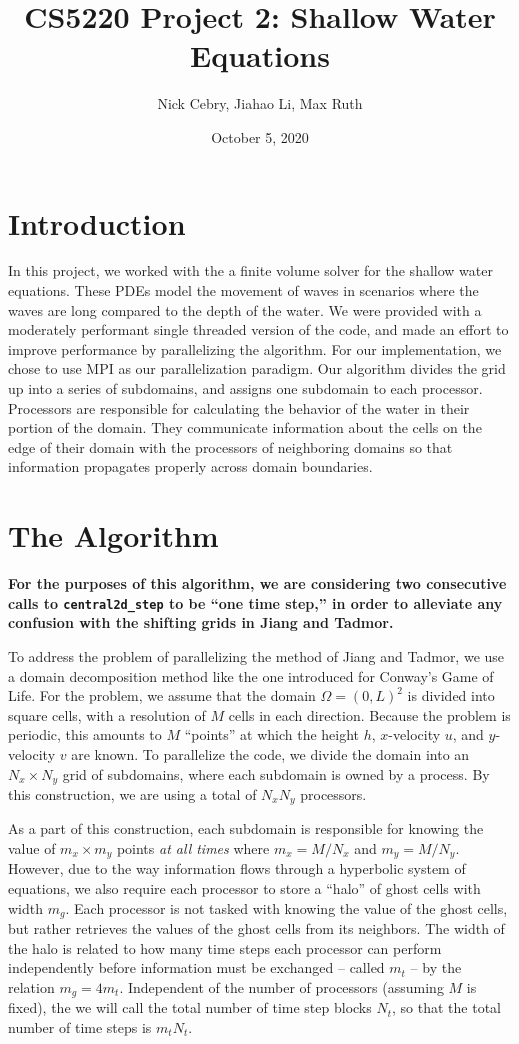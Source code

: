 \documentclass{article}
\title{CS5220 Project 2: Shallow Water Equations}
\author{Nick Cebry, Jiahao Li, Max Ruth}
\date{October 5, 2020}
\begin{document}
\maketitle

\section{Introduction}
In this project, we worked with the a finite volume solver for the shallow
water equations. These PDEs model the movement of waves in scenarios where
the waves are long compared to the depth of the water. We were provided
with a moderately performant single threaded version of the code, and made
an effort to improve performance by parallelizing the algorithm. For our
implementation, we chose to use MPI as our parallelization paradigm. Our
algorithm divides the grid up into a series of subdomains, and assigns one
subdomain to each processor. Processors are responsible for calculating
the behavior of the water in their portion of the domain. They communicate
information about the cells on the edge of their domain with the
processors of neighboring domains so that information propagates properly
across domain boundaries.

\section{The Algorithm}
\textbf{For the purposes of this algorithm, we are considering two consecutive calls to \texttt{central2d\_step} to be ``one time step,'' in order to alleviate any confusion with the shifting grids in Jiang and Tadmor.}

To address the problem of parallelizing the method of Jiang and Tadmor, we use a domain decomposition method like the one introduced for Conway's Game of Life. For the problem, we assume that the domain $\Omega = (0,L)^2$ is divided into square cells, with a resolution of $M$ cells in each direction. Because the problem is periodic, this amounts to $M$ ``points'' at which the height $h$, $x$-velocity $u$, and $y$-velocity $v$ are known. To parallelize the code, we divide the domain into an $N_x\times N_y$ grid of subdomains, where each subdomain is owned by a process. By this construction, we are using a total of $N_x N_y$ processors. 

As a part of this construction, each subdomain is responsible for knowing the value of $m_x \times m_y$ points \textit{at all times} where $m_x = M/N_x$ and $m_y = M/N_y$. However, due to the way information flows through a hyperbolic system of equations, we also require each processor to store a ``halo'' of ghost cells with width $m_g.$ Each processor is not tasked with knowing the value of the ghost cells, but rather retrieves the values of the ghost cells from its neighbors. The width of the halo is related to how many time steps each processor can perform independently before information must be exchanged -- called $m_t$ -- by the relation $m_g = 4 m_t$. Independent of the number of processors (assuming $M$ is fixed), the we will call the total number of time step blocks $N_t$, so that the total number of time steps is $m_t N_t$. 
\end{document}
